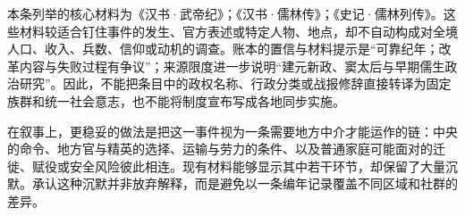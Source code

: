 本条列举的核心材料为《汉书·武帝纪》；《汉书·儒林传》；《史记·儒林列传》。这些材料较适合钉住事件的发生、官方表述或特定人物、地点，却不自动构成对全境人口、收入、兵数、信仰或动机的调查。账本的置信与材料提示是“可靠纪年；改革内容与失败过程有争议”；来源限度进一步说明“建元新政、窦太后与早期儒生政治研究”。因此，不能把条目中的政权名称、行政分类或战报修辞直接转译为固定族群和统一社会意志，也不能将制度宣布写成各地同步实施。

在叙事上，更稳妥的做法是把这一事件视为一条需要地方中介才能运作的链：中央的命令、地方官与精英的选择、运输与劳力的条件、以及普通家庭可能面对的迁徙、赋役或安全风险彼此相连。现有材料能够显示其中若干环节，却保留了大量沉默。承认这种沉默并非放弃解释，而是避免以一条编年记录覆盖不同区域和社群的差异。
